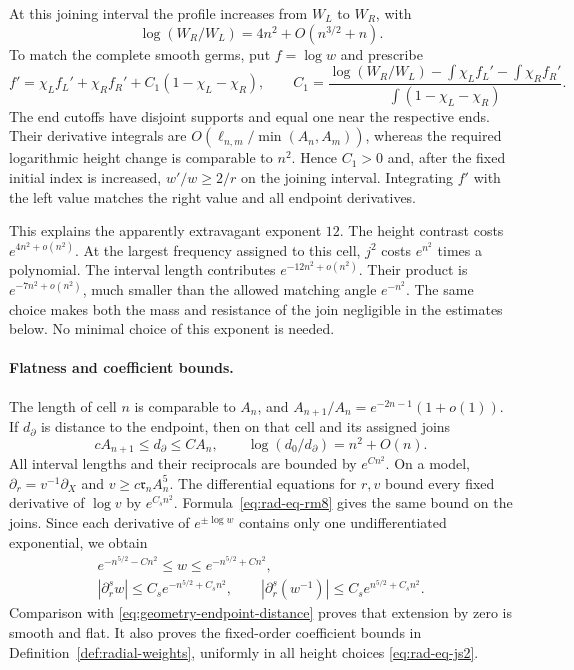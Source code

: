 At this joining interval the profile increases from $W_L$ to $W_R$,
with
\begin{equation}\label{eq:height-contrast-new}
 \log(W_R/W_L)=4n^2+O(n^{3/2}+n).
\end{equation}
To match the complete smooth germs, put $f=\log w$ and prescribe
\begin{equation}\label{eq:rad-eq-rm8}
 f'=\chi_Lf_L'+\chi_Rf_R'+C_1(1-\chi_L-\chi_R),
 \qquad
 C_1=\frac{\log(W_R/W_L)-\int\chi_Lf_L'-\int\chi_Rf_R'}
             {\int(1-\chi_L-\chi_R)}.
\end{equation}
The end cutoffs have disjoint supports and equal one near the respective
ends.  Their derivative integrals are
$O(\ell_{n,m}/\min(A_n,A_m))$, whereas the required logarithmic
height change is comparable to $n^2$.  Hence $C_1>0$ and, after the
fixed initial index is increased, $w'/w\ge2/r$ on the joining interval.
Integrating $f'$ with the left value matches the right value and all
endpoint derivatives.

This explains the apparently extravagant exponent $12$.
The height contrast costs $e^{4n^2+o(n^2)}$.  At the largest frequency
assigned to this cell, $j^2$ costs $e^{n^2}$ times a polynomial.
The interval length contributes $e^{-12n^2+o(n^2)}$.
Their product is $e^{-7n^2+o(n^2)}$, much smaller than the allowed
matching angle $e^{-n^2}$.  The same choice makes both the mass and
resistance of the join negligible in the estimates below.  No minimal
choice of this exponent is needed.

\paragraph{Flatness and coefficient bounds.}
The length of cell $n$ is comparable to $A_n$, and
$A_{n+1}/A_n=e^{-2n-1}(1+o(1))$.  If $d_\partial$ is distance to the
endpoint, then on that cell and its assigned joins
\begin{equation}\label{eq:geometry-endpoint-distance}
 cA_{n+1}\le d_\partial\le CA_n,
 \qquad \log(d_0/d_\partial)=n^2+O(n).
\end{equation}
All interval lengths and their reciprocals are bounded by $e^{Cn^2}$.
On a model, $\partial_r=v^{-1}\partial_X$ and $v\ge c\mathfrak r_nA_n^5$.
The differential equations for $r,v$ bound every fixed derivative of
$\log v$ by $e^{C_sn^2}$.  Formula~\eqref{eq:rad-eq-rm8} gives the
same bound on the joins.  Since each derivative of $e^{\pm\log w}$
contains only one undifferentiated exponential, we obtain
\begin{equation}\label{eq:geometry-profile-jets}
 \begin{gathered}
 e^{-n^{5/2}-Cn^2}\le w\le e^{-n^{5/2}+Cn^2},\\
 |\partial_r^sw|\le C_se^{-n^{5/2}+C_sn^2},\qquad
 |\partial_r^s(w^{-1})|\le C_se^{n^{5/2}+C_sn^2}.
 \end{gathered}
\end{equation}
Comparison with \eqref{eq:geometry-endpoint-distance} proves that
extension by zero is smooth and flat.  It also proves the fixed-order
coefficient bounds in Definition~\ref{def:radial-weights}, uniformly in
all height choices \eqref{eq:rad-eq-js2}.

